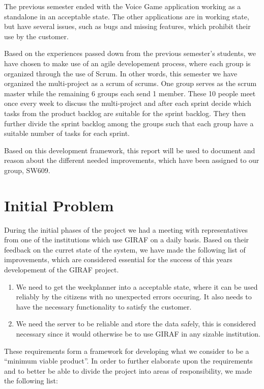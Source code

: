 The previous semester ended with the Voice Game application working as a
standalone in an acceptable state. The other applications are in working state,
but have several issues, such as bugs and missing features, which prohibit their
use by the customer.\nl

Based on the experiences passed down from the previous semester's students, we
have chosen to make use of an agile developement process, where each group is organized
through the use of Scrum. In other words, this semester we have organized the
multi-project as a scrum of scrums. One group serves as the scrum master while
the remaining 6 groups each send 1 member. These 10 people meet once every week
to discuss the multi-project and after each sprint decide which tasks from the
product backlog are suitable for the sprint backlog. They then further divide
the sprint backlog among the groups such that each group have a suitable number
of tasks for each sprint.\nl

Based on this development framework, this report will be used to document and
reason about the different needed improvements, which have been assigned to our
group, SW609.
  
\section{Initial Problem}
During the initial phases of the project we had a meeting with representatives
from one of the institutions which use GIRAF on a daily basis. Based on their
feedback on the curret state of the system, we have made the following list of
improvements, which are considered essential for the success of this years
developement of the GIRAF project.

\begin{enumerate}
  \item We need to get the weekplanner into a acceptable state, where it can be
  used reliably by the citizens with no unexpected errors occuring. It also
  needs to have the necessary functionality to satisfy the customer.
  \item We need the server to be reliable and store the data safely, this is
  considered necessary since it would otherwise be to use GIRAF in any sizable
  institution.
\end{enumerate}

These requirements form a framework for developing what we consider to be a
``minimum viable product''. In order to further elaborate upon the requirements
and to better be able to divide the project into areas of responsibility, we
made the following list:


